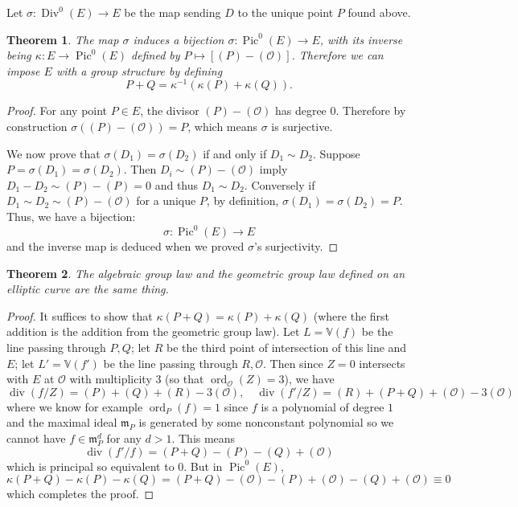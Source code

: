 \documentclass[12pt]{article}
\newtheorem{theorem}{Theorem}[subsection]
\theoremstyle{remark}
\theoremstyle{definition}
\newcommand{\ord}[0]{\operatorname{ord}}
\newcommand{\s}[0]{\sigma}
\newcommand{\ecO}[0]{\mathcal O}
\newcommand{\kp}[0]{\kappa}
\newcommand{\Div}[0]{\operatorname{Div}}
\newcommand{\pdiv}[0]{\operatorname{div}}
\newcommand{\Pic}[0]{\operatorname{Pic}}
\begin{document}
        Let $\s:\Div^0(E)\to E$ be the map sending $D$ to the unique point $P$ found above.
        \begin{theorem}\label{theorem-alg-group}
            The map $\s$ induces a bijection $\s:\Pic^0(E)\to E$, with its inverse being $\kp:E\to\Pic^0(E)$ defined by $P\mapsto [(P)-(\mathcal O)]$. Therefore we can impose $E$ with a group structure by defining
            \[P+Q=\kp^{-1}(\kp(P)+\kp(Q)).\]
        \end{theorem}
        \begin{proof}
            For any point $P\in E$, the divisor $(P)-(\mathcal O)$ has degree $0$. Therefore by construction $\s((P)-(\mathcal O))=P$, which means $\s$ is surjective.

            We now prove that $\s(D_1)=\s(D_2)$ if and only if $D_1\sim D_2$. Suppose $P=\s(D_1)=\s(D_2)$. Then $D_i\sim (P)-(\ecO)$ imply $D_1-D_2\sim(P)-(P)=0$ and thus $D_1\sim D_2$. Conversely if $D_1\sim D_2\sim (P)-(\ecO)$ for a unique $P$, by definition, $\s(D_1)=\s(D_2)=P$. Thus, we have a bijection:
            \[\s:\Pic^0(E)\to E\]
            and the inverse map is deduced when we proved $\s$'s surjectivity.
        \end{proof}
        \begin{theorem}\label{theorem=same-law}
            The algebraic group law and the geometric group law defined on an elliptic curve are the same thing.
        \end{theorem}
        \begin{proof}
            It suffices to show that $\kp(P+Q)=\kp(P)+\kp(Q)$ (where the first addition is the addition from the geometric group law). Let $L=\mathbb V(f)$ be the line passing through $P,Q$; let $R$ be the third point of intersection of this line and $E$; let $L'=\mathbb V(f')$ be the line passing through $R,\ecO$. Then since $Z=0$ intersects with $E$ at $\ecO$ with multiplicity $3$ (so that $\ord_\ecO (Z)=3$), we have
            \[\pdiv(f/Z)=(P)+(Q)+(R)-3(\ecO),\quad \pdiv(f'/Z)=(R)+(P+Q)+(\ecO)-3(\ecO)\]
            where we know for example $\ord_P(f)=1$ since $f$ is a polynomial of degree $1$ and the maximal ideal $\mathfrak m_P$ is generated by some nonconstant polynomial so we cannot have $f\in \mathfrak m_P^d$ for any $d>1$. This means
            \[\pdiv(f'/f)=(P+Q)-(P)-(Q)+(\ecO)\]
            which is principal so equivalent to $0$. But in $\Pic^0(E)$,
            \[\kp(P+Q)-\kp(P)-\kp(Q)=(P+Q)-(\ecO)-(P)+(\ecO)-(Q)+(\ecO)\equiv 0\]
            which completes the proof.
        \end{proof}
\end{document}
